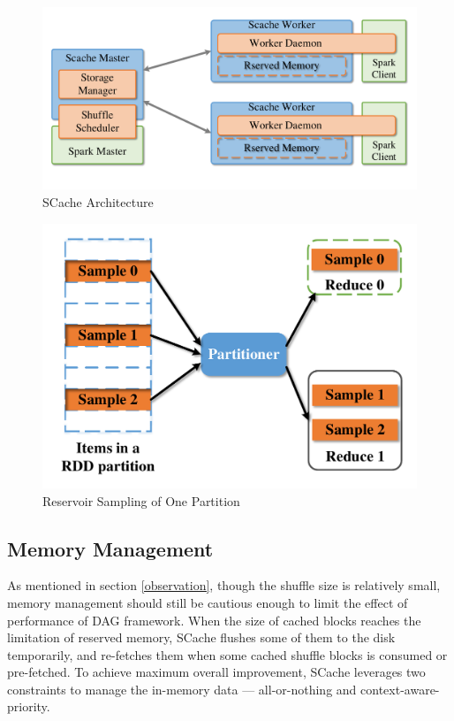 \begin{figure}
	\centering
	\includegraphics[width=0.9\linewidth]{fig/arch}
	\caption{SCache Architecture}
	\label{fig:arch}
\end{figure}
\begin{figure}
	\centering
	\includegraphics[width=0.7\linewidth]{fig/sample}
	\caption{Reservoir Sampling of One Partition}
	\label{fig:sample}
\end{figure}

\subsection{Memory Management}\label{memorymanage}
As mentioned in section \ref{observation}, though the shuffle size is relatively small, memory management should still be cautious enough to limit the effect of performance of DAG framework.
When the size of cached blocks reaches the limitation of reserved memory, SCache flushes some of them to the disk temporarily, and re-fetches them when some cached shuffle blocks is consumed or pre-fetched. To achieve maximum overall improvement, SCache leverages two constraints to manage the in-memory data --- all-or-nothing and context-aware-priority.

